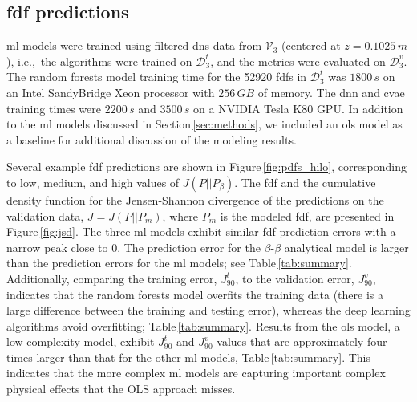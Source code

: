 \documentclass[review]{elsarticle}
\begin{document}
\subsection{\Acrlong{fdf} predictions}\label{sec:predictions}

\Gls{ml} models were trained using filtered \gls{dns} data from
$\mathcal{V}_3$ (centered at $z=0.1025\,\unit{m}$), i.e.,\ the
algorithms were trained on $\mathcal{D}_3^t$, and the metrics were
evaluated on $\mathcal{D}_3^v$. The random forests model training time
for the 52920 \glspl{fdf} in $\mathcal{D}_3^t$ was $1800\,\unit{s}$ on
an Intel SandyBridge Xeon processor with $256\,\unit{GB}$ of
memory. The \gls{dnn} and \gls{cvae} training times were
$2200\,\unit{s}$ and $3500\,\unit{s}$ on a NVIDIA Tesla K80 GPU. In
addition to the \gls{ml} models discussed in
Section\,\ref{sec:methods}, we included an \gls{ols} model as a
baseline for additional discussion of the modeling results.

Several example \gls{fdf} predictions are shown in
Figure\,\ref{fig:pdfs_hilo}, corresponding to low, medium, and high
values of $J(P||P_{\beta})$. The \gls{fdf} and the cumulative density
function for the Jensen-Shannon divergence of the predictions on the
validation data, $J=J(P||P_m)$, where $P_m$ is the modeled \gls{fdf},
are presented in Figure\,\ref{fig:jsd}. The three \gls{ml} models
exhibit similar \gls{fdf} prediction errors with a narrow peak close
to 0. The prediction error for the $\beta$-$\beta$ analytical model is
larger than the prediction errors for the \gls{ml} models; see
Table\,\ref{tab:summary}. Additionally, comparing the training error,
$J^t_{90}$, to the validation error, $J^v_{90}$, indicates that the
random forests model overfits the training data (there is a large
difference between the training and testing error), whereas the deep
learning algorithms avoid overfitting;
Table\,\ref{tab:summary}. Results from the \gls{ols} model, a low
complexity model, exhibit $J^t_{90}$ and $J^v_{90}$ values that are
approximately four times larger than that for the other \gls{ml}
models, Table\,\ref{tab:summary}. This indicates that the more complex
\gls{ml} models are capturing important complex physical effects that
the OLS approach misses.
\end{document}
